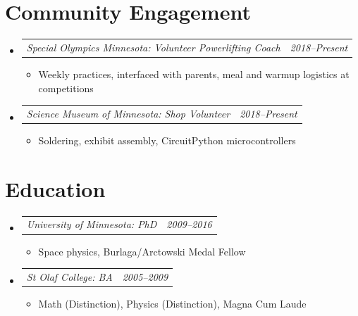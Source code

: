 \documentclass[12pt,letterpaper]{article}
\makeatletter
\newcommand{\headerpair}[2]{
    \begin{tabular*}{\linewidth}{l@{ \extracolsep{\fill} }r} {\large\emph{#1}} & {\large\emph{#2}}
    \end{tabular*}
}
\newcommand{\headerrow}[3]{\headerpair{#2: #1}{#3}}
\newcommand{\ResumeSection}[1]{\section*{{\color{MidnightBlue}#1 \sout{\hfill}}}}
\makeatother
\begin{document}

\ResumeSection{Community Engagement}

\begin{itemize}[leftmargin=\parindent]
    \parskip=0.1em
    \itemsep=1.2em

    \item[]
        \headerrow
            {Volunteer Powerlifting Coach}
            {Special Olympics Minnesota}
            {2018--Present}
        \begin{itemize}[leftmargin=\parindent]
            \itemsep=0.3em

            \item Weekly practices, interfaced with parents, meal and warmup logistics at competitions
        \end{itemize}
    \item[]
        \headerrow
            {Shop Volunteer}
            {Science Museum of Minnesota}
            {2018--Present}
        \begin{itemize}[leftmargin=\parindent]
            \itemsep=0.3em

            \item Soldering, exhibit assembly, CircuitPython microcontrollers
        \end{itemize}
\end{itemize}


\ResumeSection{Education}

\begin{itemize}[leftmargin=\parindent]
    \parskip=0.1em
    \itemsep=1.2em

    \item[]
        \headerrow
            {PhD}
            {University of Minnesota}
            {2009--2016}
        \begin{itemize}[leftmargin=\parindent]
            \item Space physics, Burlaga/Arctowski Medal Fellow
        \end{itemize}
    \item[]
        \headerrow
            {BA}
            {St Olaf College}
            {2005--2009}
        \begin{itemize}[leftmargin=\parindent]
            \item Math (Distinction), Physics (Distinction), Magna Cum Laude
        \end{itemize}
\end{itemize}
\end{document}
